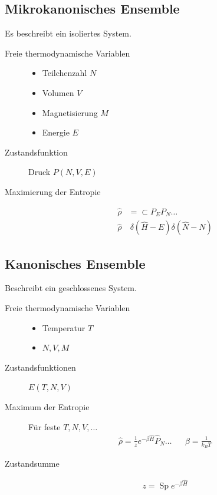 \documentclass[11pt]{article}
\theoremstyle{plain}
\begin{document}
\subsection*{Mikrokanonisches Ensemble}
Es beschreibt ein isoliertes System.
\begin{description}
  \item[Freie thermodynamische Variablen] 
    \begin{itemize}
      \item Teilchenzahl $N$
      \item Volumen $V$
      \item Magnetisierung $M$
      \item Energie $E$
    \end{itemize}
  \item[Zustandsfunktion] Druck $P(N,V,E)$
  \item[Maximierung der Entropie] 
    \begin{align*}
      \hat{\rho} & = \subset P_E P_N \ldots \\
      \hat{\rho} & ~ \delta(\hat{H} - E) \delta (\hat{N} - N)
    \end{align*}
\end{description}
\subsection*{Kanonisches Ensemble}
Beschreibt ein geschlossenes System.
\begin{description}
  \item[Freie thermodynamische Variablen] 
    \begin{itemize}
      \item Temperatur $T$
      \item $N, V, M$
    \end{itemize}
  \item[Zustandsfunktionen] $E(T, N, V)$
  \item [Maximum der Entropie] 
    F\"ur feste $T, N, V, \ldots$
    \begin{align*}
      \hat{\rho} = \frac{1}{z} e^{- \beta \hat{H} } \hat{P}_N \ldots && 
      \beta = \frac{1}{k_B T}
    \end{align*}
  \item[Zustandsumme]
    \begin{align*}
      z= \operatorname{Sp} e^{- \beta \hat{H}}
    \end{align*}
\end{description}
\end{document}
